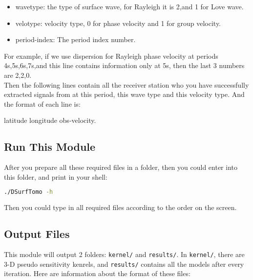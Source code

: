 \documentclass[UTF8]{article}
\begin{document}
    \begin{itemize}
        \item wavetype: the type of surface wave, for Rayleigh it is 2,and 1 for Love wave.
        \item velotype: velocity type, 0 for phase velocity and 1 for group velocity.
        \item period-index: The period index number.
    \end{itemize}
    For example, if we use dispersion for Rayleigh phase velocity 
    at periods 4s,5s,6s,7s,and this line contains information only at 5s, then the last 3 numbers 
    are 2,2,0.\\

    Then the following lines contain all the receiver station who you have successfully extracted
    signals from at this period, this wave type and this velocity type. And the format of each line 
    is:
    \begin{center}
        latitude longitude obs-velocity.
    \end{center} 
    

    \subsection{Run This Module}
    After you prepare all these required files in a folder, then you could enter into this folder,
    and print in your shell:
    \begin{lstlisting}[language=bash]
    ./DSurfTomo -h
    \end{lstlisting}
    Then you could type in all required files according to the order on the screen.

    \subsection{Output Files}\label{surface wave output files}
    This module will output 2 folders: \verb!kernel/! and \verb!results/!. In \verb!kernel/!, there are 3-D pseudo sensitivity kenrels, and \verb!results/! contains 
    all the models after every iteration. Here are information about the format of these files:
\end{document}
